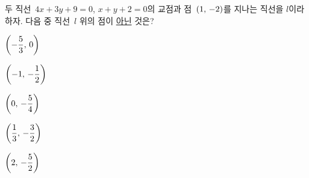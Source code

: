 두 직선~$4x+3y+9=0$, $x+y+2=0$의 교점과 점~$(1,\mkern3mu -2)$를 지나는 직선을 $l$이라 하자. 다음 중 직선~$l$ 위의 점이 \underline{아닌} 것은?
\begin{choices32}{\rule[-3ex]{0pt}{8ex}$\left(-\dfrac{5}{3},\mkern3mu 0\right)$}{\rule[-3ex]{0pt}{8ex}$\left(-1,\mkern3mu -\dfrac{1}{2}\right)$}{\rule[-3ex]{0pt}{8ex}$\left(0,\mkern3mu -\dfrac{5}{4}\right)$}{\rule[-3ex]{0pt}{8ex}$\left(\dfrac{1}{3},\mkern3mu -\dfrac{3}{2}\right)$}{\rule[-3ex]{0pt}{8ex}$\left(2,\mkern3mu -\dfrac{5}{2}\right)$}\end{choices32}
